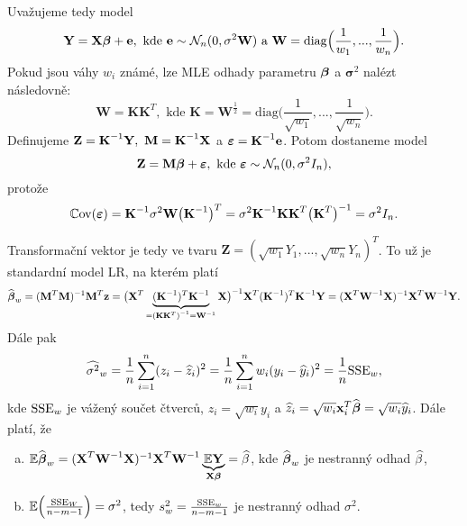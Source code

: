 Uvažujeme tedy model 
\begin{equation}\label{rovnickaW}
\textbf{Y}=\textbf{X}\boldsymbol{\beta}+\textbf{e},\text{ kde }\textbf{e}\sim\mathcal{N}_n(0,\sigma^2\textbf{W})\text{ a }\textbf{W}=\mathrm{diag}\Big(\frac{1}{w_1},...,\frac{1}{w_n}\Big).
\end{equation}
Pokud jsou váhy $w_i$ známé, lze MLE odhady parametru $\boldsymbol{\beta}$ a $\boldsymbol{\sigma}^2$ nalézt následovně:
$$
\textbf{W}=\textbf{K} \textbf{K}^T,\text{ kde }\textbf{K}=\textbf{W}^{\frac{1}{2}}=\mathrm{diag}\Big(\frac{1}{\sqrt{w_1}},...,\frac{1}{\sqrt{w_n}}\Big).
$$
Definujeme $\textbf{Z}={\textbf{K}^{-1}}\textbf{Y},~\textbf{M}={\textbf{K}^{-1}}\textbf{X}$ a $\boldsymbol{\varepsilon}={\textbf{K}^{-1}}\textbf{e}$. Potom dostaneme model 
\begin{equation}\label{rovnickaW2}
\textbf{Z}=\textbf{M}\boldsymbol{\beta}+\boldsymbol{\varepsilon},\text{ kde }\boldsymbol{\varepsilon}\sim\mathcal{N}_n(0,\sigma^2 I_n),
\end{equation}
protože
$$
\mathbb{C}\mathrm{ov}(\boldsymbol{\varepsilon})={\textbf{K}^{-1}}\sigma^2\textbf{W}\big({\textbf{K}^{-1}}\big)^T=\sigma^2 {\textbf{K}^{-1}}\textbf{K}\textbf{K}^T\big(\textbf{K}^T\big)^{-1}=\sigma^2 I_n.
$$

Transformační vektor je tedy ve tvaru $\textbf{Z}=(\sqrt{w_1}Y_1,...,\sqrt{w_n}Y_n)^T$. To už je standardní model LR, na kterém platí
$$ \widehat{\boldsymbol{\beta}}_w={(\textbf{M}^T\textbf{M})^{-1}}\textbf{M}^T\textbf{z}={\big(\textbf{X}^T\underbrace{(\textbf{K}^{-1})^T {\textbf{K}^{-1}}}_{={{(\textbf{K}\textbf{K}^T)}^{-1}}={\textbf{W}^{-1}}}\textbf{X}\big)^{-1}}\textbf{X}^T({\textbf{K}^{-1}})^T{\textbf{K}^{-1}}\textbf{Y}={(\textbf{X}^T{\textbf{W}^{-1}}\textbf{X})^{-1}}\textbf{X}^T{\textbf{W}^{-1}}\textbf{Y}.$$
Dále pak 
$$\widehat{{\sigma}^2}_w=\frac{1}{n}\sum\limits_{i=1}^{n} (z_i-\widehat{z}_i)^2=\frac{1}{n}\sum\limits_{i=1}^{n} w_i(y_i-\widehat{y}_i)^2=\frac{1}{n}\mathrm{SSE}_w,$$ kde $\mathrm{SSE}_w$ je vážený součet čtverců, $z_i=\sqrt{w_i}y_i$ a $\widehat{z}_i=\sqrt{w_i}\textbf{x}_i^T\widehat{\boldsymbol{\beta}}=\sqrt{w_i}\widehat{y}_i$.
Dále platí, že
\begin{enumerate}[a)]
	\item  $\mathbb{E}\widehat{\boldsymbol{\beta}}_w={(\textbf{X}^T{\textbf{W}^{-1}}\textbf{X})^{-1}}\textbf{X}^T{\textbf{W}^{-1}}\underbrace{\mathbb{E} \textbf{Y}}_{\textbf{X}\boldsymbol{\beta}}=\widehat{\beta}$, kde $\widehat{\boldsymbol{\beta}}_w$ je nestranný odhad $\widehat{\beta}$,
	\item $\mathbb{E}\Big(\frac{\mathrm{SSE}_W}{n-m-1}\Big)=\sigma^2$, tedy $s_w^2=\frac{\mathrm{SSE}_w}{n-m-1}$ je nestranný odhad $\sigma^2$.
\end{enumerate}

